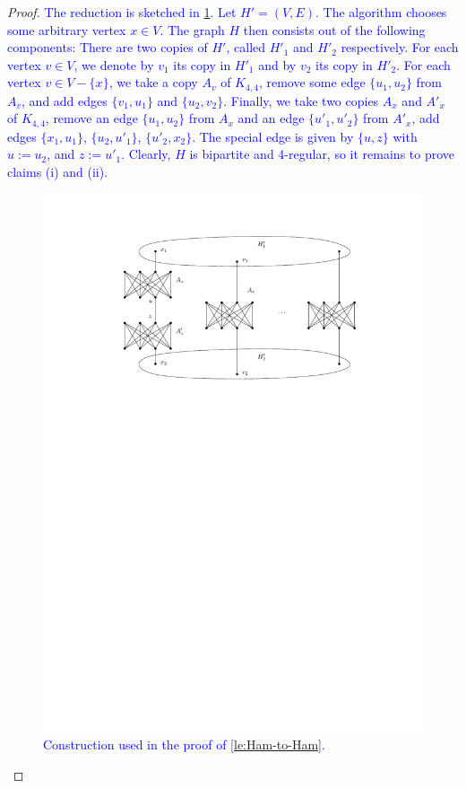 \documentclass[runningheads]{llncs}
\newcommand{\set}[1]{\{ #1 \}}
\newcommand{\lasse}[1]{\textcolor{blue}{#1}}
\begin{document}
\begin{proof}
\lasse{
The reduction is sketched in \cref{fig_hamilton_cycle_lemma}. Let $H' = (V, E)$. The algorithm chooses some arbitrary vertex $x \in V$. The graph $H$ then consists out of the following components: There are two copies of $H'$, called $H'_1$ and $H'_2$ respectively. For each vertex $v \in V$, we denote by $v_1$ its copy in $H'_1$ and by $v_2$ its copy in $H'_2$. For each vertex $v \in V-\set{x}$, we take a copy $A_v$ of $K_{4,4}$, remove some edge $\set{u_1, u_2}$ from $A_v$, and add edges $\set{v_1,u_1}$ and $\set{u_2,v_2}$. Finally, we take two copies $A_x$ and $A'_x$ of $K_{4,4}$, remove an edge $\set{u_1,u_2}$ from $A_x$ and an edge $\set{u'_1,u'_2}$ from $A'_x$, add edges $\set{x_1,u_1}$, $\set{u_2,u'_1}$, $\set{u'_2,x_2}$. The special edge is given by $\set{u, z}$ with $u := u_2$, and $z := u'_1$. Clearly, $H$ is bipartite and 4-regular, so it remains to prove claims (i) and (ii).
}
\begin{figure}[htpb]
\centering
\includegraphics[scale=0.92]{img/hamilton-prime}
\caption{\lasse{Construction used in the proof of \cref{le:Ham-to-Ham}.}}
\label{fig_hamilton_cycle_lemma}
\end{figure}


\end{proof}
\end{document}
